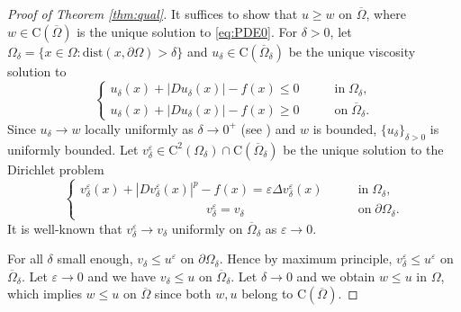 \documentclass[11pt,reqno]{amsart}
\numberwithin{figure}{section}
\theoremstyle{plain}
\theoremstyle{remark}
\numberwithin{equation}{section}
\newcommand{\rmC}{\mathrm{C}}
\begin{document}
\begin{proof}[Proof of Theorem \ref{thm:qual}]
It suffices to show that $u\geq w$ on $\overline{\Omega}$, where $w\in \rmC(\overline{\Omega})$ is the unique solution to \eqref{eq:PDE0}. For $\delta>0$, let $\Omega_\delta = \{x\in \Omega: \mathrm{dist}(x,\partial \Omega) > \delta\}$ and $u_\delta\in\rmC(\overline{\Omega}_\delta)$ be the  unique viscosity solution to
\begin{equation}\label{e:v_v}
    \begin{cases}
      u_\delta(x) + |Du_\delta(x)|-f(x) \leq 0 &\qquad\text{in}\;\Omega_\delta,\\
      u_\delta(x) + |Du_\delta(x)| - f(x) \geq 0 &\qquad\text{on}\;\overline{\Omega}_\delta.
    \end{cases}
\end{equation}
Since $u_\delta\rightarrow w$ locally uniformly as $\delta\rightarrow 0^+$ (see \cite{kim_state-constraint_2020}) and $w$ is bounded, $\{u_\delta\}_{\delta>0}$ is uniformly bounded. Let $v^\varepsilon_\delta\in \rmC^2(\Omega_\delta)\cap \rmC(\overline{\Omega}_\delta)$ be the unique solution to the Dirichlet problem
\begin{equation}\label{eq:vv_eps}
\begin{cases}
      v_\delta^\varepsilon(x) + |Dv_\delta^\varepsilon(x)|^p - f(x) = \varepsilon \Delta v_\delta^\varepsilon(x) &\qquad\text{in}\;\Omega_\delta,\\
    \;\;\;\,\quad\qquad\qquad\qquad\qquad v_\delta^\varepsilon = v_\delta &\qquad \text{on}\;\partial\Omega_\delta.
\end{cases}
\end{equation}
It is well-known that $v^\varepsilon_\delta\to v_\delta$ uniformly on $\overline{\Omega}_\delta$ as $\varepsilon\to 0$.

For all $\delta$ small enough, $v_\delta\leq u^\varepsilon$ on $\partial \Omega_\delta$. Hence by maximum principle, $v^\varepsilon_\delta \leq u^\varepsilon$ on $\overline{\Omega}_\delta$. Let $\varepsilon\to 0$ and we have $v_\delta \leq u$ on $\overline{\Omega}_\delta$.
Let $\delta\rightarrow 0$ and we obtain $w\leq u$ in $\Omega$, which implies $w\leq u$ on $\overline{\Omega}$ since both $w,u$ belong to $\rmC(\overline{\Omega})$.
\end{proof}
\end{document}
